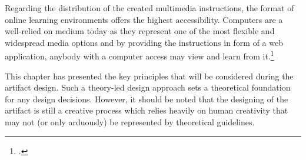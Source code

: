 Regarding the distribution of the created multimedia instructions, the format of online learning environments offers the highest accessibility. Computers are a well-relied on medium today as they represent one of the most flexible and widespread media options and by providing the instructions in form of a web application, anybody with a computer access may view and learn from it.\footcites[Cf.][chapter 1, paragraphs 6 et seq]{ClarkElearningscienceinstruction2016}[cf.][p.906]{BaharinEvaluationSatisfactionUsing2015}

This chapter has presented the key principles that will be considered during the artifact design. Such a theory-led design approach sets a theoretical foundation for any design decisions. However, it should be noted that the designing of the artifact is still a creative process which relies heavily on human creativity that may not (or only arduously) be represented by theoretical guidelines.

